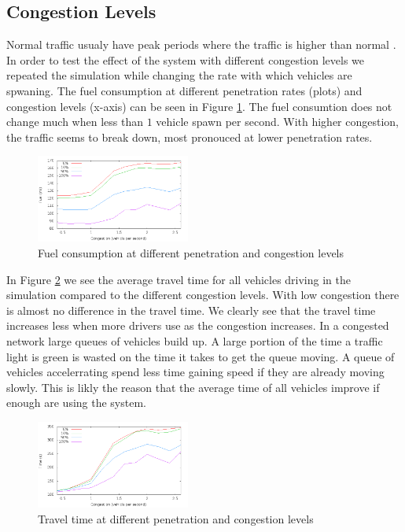 \subsection{Congestion Levels}
Normal traffic usualy have peak periods where the traffic is higher than normal \cite{Vejdir}. 
In order to test the effect of the system with different congestion levels we repeated the simulation while changing the rate with which vehicles are spwaning. 
The fuel consumption at different penetration rates (plots) and congestion levels (x-axis) can be seen in Figure \ref{fig:TestResults:congestionFuel}. 
The fuel consumtion does not change much when less than $1$ vehicle spawn per second.
With higher congestion, the traffic seems to break down, most pronouced at lower penetration rates. %
\begin{figure}[htb]
\includegraphics[width=0.45\textwidth]{../images/fuelCongestion.png}
\caption{Fuel consumption at different penetration and congestion levels}
\label{fig:TestResults:congestionFuel}
\end{figure}

In Figure \ref{fig:TestResults:congestionTime} we see the average travel time for all vehicles driving in the simulation compared to the different congestion levels. 
With low congestion there is almost no difference in the travel time.
We clearly see that the travel time increases less when more drivers use \tech as the congestion increases. %
In a congested network large queues of vehicles build up. 
A large portion of the time a traffic light is green is wasted on the time it takes to get the queue moving. 
A queue of vehicles accelerrating spend less time gaining speed if they are already moving slowly. 
This is likly the reason that the average time of all vehicles improve if enough are using the system.
\begin{figure}[htb]
\includegraphics[width=0.45\textwidth]{../images/timeCongestion.png}
\caption{Travel time at different penetration and congestion levels}
\label{fig:TestResults:congestionTime}
\end{figure}

